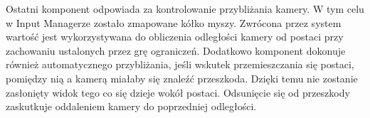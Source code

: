Ostatni komponent odpowiada za kontrolowanie przybliżania kamery. W tym celu w Input Managerze zostało zmapowane kółko
myszy. Zwrócona przez system wartość jest wykorzystywana do obliczenia odległości kamery od postaci przy zachowaniu
ustalonych przez grę ograniczeń. Dodatkowo komponent dokonuje również automatycznego przybliżania, jeśli wskutek
przemieszczania się postaci, pomiędzy nią a kamerą miałaby się znaleźć przeszkoda. Dzięki temu nie zostanie zasłonięty
widok tego co się dzieje wokół postaci. Odsunięcie się od przeszkody zaskutkuje oddaleniem kamery do poprzedniej
odległości.
